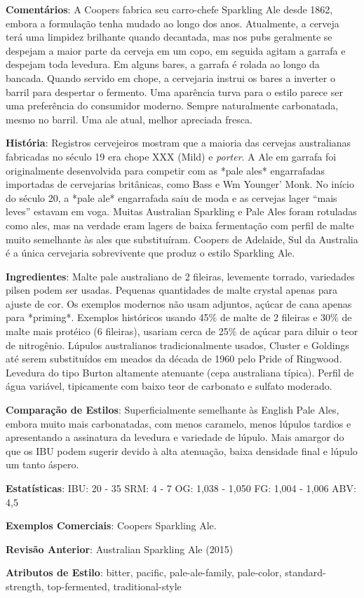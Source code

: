 \textbf{Comentários}: A Coopers fabrica seu carro-chefe Sparkling Ale desde 1862, embora a formulação tenha mudado ao longo dos anos. Atualmente, a cerveja terá uma limpidez brilhante quando decantada, mas nos pubs geralmente se despejam a maior parte da cerveja em um copo, em seguida agitam a garrafa e despejam toda levedura. Em alguns bares, a garrafa é rolada ao longo da bancada. Quando servido em chope, a cervejaria instrui os bares a inverter o barril para despertar o fermento. Uma aparência turva para o estilo parece ser uma preferência do consumidor moderno. Sempre naturalmente carbonatada, mesmo no barril. Uma ale atual, melhor apreciada fresca.

\textbf{História}: Registros cervejeiros mostram que a maioria das cervejas australianas fabricadas no século 19 era chope XXX (Mild) e \textit{porter}. A Ale em garrafa foi originalmente desenvolvida para competir com as *pale ales* engarrafadas importadas de cervejarias britânicas, como Bass e Wm Younger' Monk. No início do século 20, a *pale ale* engarrafada saiu de moda e as cervejas lager “mais leves” estavam em voga. Muitas Australian Sparkling e Pale Ales foram rotuladas como ales, mas na verdade eram lagers de baixa fermentação com perfil de malte muito semelhante às ales que substituíram. Coopers de Adelaide, Sul da Australia é a única cervejaria sobrevivente que produz o estilo Sparkling Ale.

\textbf{Ingredientes}: Malte pale australiano de 2 fileiras, levemente torrado, variedades pilsen podem ser usadas. Pequenas quantidades de malte crystal apenas para ajuste de cor. Os exemplos modernos não usam adjuntos, açúcar de cana apenas para *priming*. Exemplos históricos usando 45\% de malte de 2 fileiras e 30\% de malte mais protéico (6 fileiras), usariam cerca de 25\% de açúcar para diluir o teor de nitrogênio. Lúpulos australianos tradicionalmente usados, Cluster e Goldings até serem substituídos em meados da década de 1960 pelo Pride of Ringwood. Levedura do tipo Burton altamente atenuante (cepa australiana típica). Perfil de água variável, tipicamente com baixo teor de carbonato e sulfato moderado.

\textbf{Comparação de Estilos}: Superficialmente semelhante às English Pale Ales, embora muito mais carbonatadas, com menos caramelo, menos lúpulos tardios e apresentando a assinatura da levedura e variedade de lúpulo. Mais amargor do que os IBU podem sugerir devido à alta atenuação, baixa densidade final e lúpulo um tanto áspero.

\textbf{Estatísticas}: IBU: 20 - 35
SRM: 4 - 7
OG: 1,038 - 1,050
FG: 1,004 - 1,006
ABV: 4,5%

\textbf{Exemplos Comerciais}: Coopers Sparkling Ale.

\textbf{Revisão Anterior}: Australian Sparkling Ale (2015)

\textbf{Atributos de Estilo}: bitter, pacific, pale-ale-family, pale-color, standard-strength, top-fermented, traditional-style
